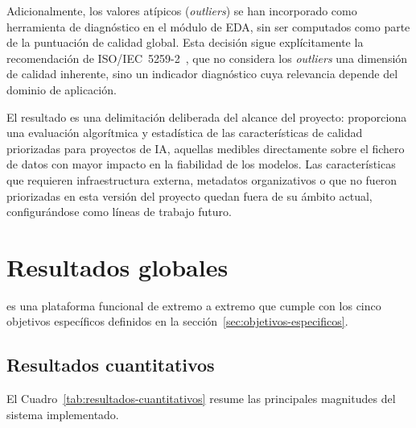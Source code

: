 Adicionalmente, los valores atípicos (\emph{outliers}) se han incorporado
como herramienta de diagnóstico en el módulo de \ac{EDA}, sin ser
computados como parte de la puntuación de calidad global.  Esta decisión
sigue explícitamente la recomendación de
\ac{ISO}/\ac{IEC}~5259-2~\citep{iso5259}, que no considera los \emph{outliers}
una dimensión de calidad inherente, sino un indicador diagnóstico cuya
relevancia depende del dominio de aplicación.

El resultado es una delimitación deliberada del alcance del proyecto:
\dataqual proporciona una evaluación algorítmica y estadística de las
características de calidad priorizadas para proyectos de \ac{IA}, aquellas
medibles directamente sobre el fichero de datos con mayor impacto en la
fiabilidad de los modelos.  Las características que requieren
infraestructura externa, metadatos organizativos o que no fueron
priorizadas en esta versión del proyecto quedan fuera de su ámbito actual,
configurándose como líneas de trabajo futuro.


\section{Resultados globales}
\label{sec:resultados-alcanzados}

\dataqual es una plataforma funcional de extremo a extremo que cumple con los
cinco objetivos específicos definidos en la
sección~\ref{sec:objetivos-especificos}.

\subsection{Resultados cuantitativos}

El Cuadro~\ref{tab:resultados-cuantitativos} resume las principales
magnitudes del sistema implementado.

